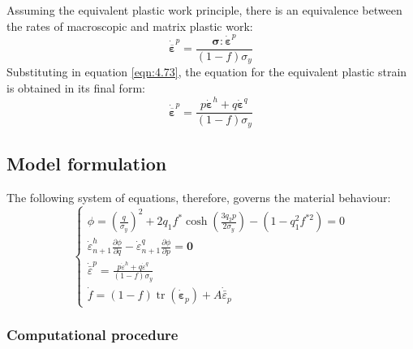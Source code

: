 \documentclass[sn-mathphys,Numbered,draft]{sn-jnl}%
\begin{document}

Assuming the equivalent plastic work principle, there is an equivalence between the rates of macroscopic and matrix plastic work:
\begin{equation}
\dot{\overline{\boldsymbol{\varepsilon}}}^p=\frac{\boldsymbol{\sigma}: \dot{\boldsymbol{\varepsilon}}^p}{(1-f) \sigma_y}
\end{equation}
Substituting in equation \ref{eqn:4.73}, the equation for the equivalent plastic strain is obtained in its final form:
\begin{equation}
\dot{\overline{\boldsymbol{\varepsilon}}}^p=\frac{p \dot{ \boldsymbol{\varepsilon}}^h+q \dot{\boldsymbol{\varepsilon}}^q}{(1-f) \sigma_y}
\end{equation}

\subsection{Model formulation}

The following system of equations, therefore, governs the material behaviour:
\begin{equation}
\label{eqn:4.79}
\left\{\begin{array}{c}
\phi=\left(\frac{q}{\sigma_y}\right)^2+2 q_1 f^* \cosh \left(\frac{3 q_2 p}{2 \sigma_y}\right)-\left(1-q_1^2 f^{* 2}\right)=0 \\
\dot{\varepsilon}_{n+1}^h \frac{\partial \phi}{\partial q}-\dot{\varepsilon}_{n+1}^q \frac{\partial \phi}{\partial p}=\mathbf{0} \\
\dot{\bar{\varepsilon}}^p=\frac{p \dot{ \varepsilon}^h+q \dot{ \varepsilon}^q}{(1-f) \sigma_y} \\
\dot{f}=(1-f) \operatorname{tr}\left(\dot{\boldsymbol{\varepsilon}}_p\right)+A \dot{\bar{\varepsilon}}_p
\end{array}\right.
\end{equation}


\subsubsection{Computational procedure}
\end{document}
